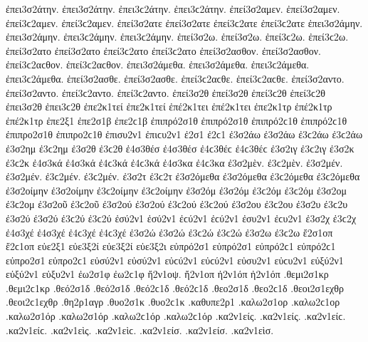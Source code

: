 {ἐπει3σ2άτην. ἐπει3σ2άτην. ἐπει3ϲ2άτην. ἐπει3ϲ2άτην. 
ἐπεί3σ2αμεν. ἐπεί3σ2αμεν. ἐπεί3ϲ2αμεν. ἐπεί3ϲ2αμεν. 
ἐπεί3σ2ατε ἐπεί3σ2ατε ἐπεί3ϲ2ατε ἐπεί3ϲ2ατε 
ἐπει3σ2άμην. ἐπει3σ2άμην. ἐπει3ϲ2άμην. ἐπει3ϲ2άμην. 
ἐπεί3σ2ω. ἐπεί3σ2ω. ἐπεί3ϲ2ω. ἐπεί3ϲ2ω. 
ἐπεί3σ2ατο ἐπεί3σ2ατο ἐπεί3ϲ2ατο ἐπεί3ϲ2ατο 
ἐπεί3σ2ασθον. ἐπεί3σ2ασθον. ἐπεί3ϲ2αϲθον. ἐπεί3ϲ2αϲθον. 
ἐπει3σ2άμεθα. ἐπει3σ2άμεθα. ἐπει3ϲ2άμεθα. ἐπει3ϲ2άμεθα. 
ἐπεί3σ2ασθε. ἐπεί3σ2ασθε. ἐπεί3ϲ2αϲθε. ἐπεί3ϲ2αϲθε. 
ἐπεί3σ2αντο. ἐπεί3σ2αντο. ἐπεί3ϲ2αντο. ἐπεί3ϲ2αντο. 
ἐπεί3σ2θ ἐπεί3σ2θ ἐπεί3ϲ2θ ἐπεί3ϲ2θ   %
ἐπει3σ2θ ἐπει3ϲ2θ 
ἐπε2κ1τεί ἐπε2κ1τεί   %
ἐπέ2κ1τει ἐπέ2κ1τει 
ἐπε2κ1τρ   %
ἐπέ2κ1τρ ἐπέ2κ1τρ 
ἐπε2ξ1 
ἐπε2σ1β ἐπε2ϲ1β   %
ἐπιπρό2σ1θ ἐπιπρό2σ1θ ἐπιπρό2ϲ1θ ἐπιπρό2ϲ1θ   %
ἐπιπρο2σ1θ ἐπιπρο2ϲ1θ 
ἐπισυ2ν1 ἐπιϲυ2ν1   %
ἐ2σ1 ἐ2ϲ1 
ἐ3σ2άω ἐ3σ2άω ἐ3ϲ2άω ἐ3ϲ2άω   %
ἐ3σ2ημ ἐ3ϲ2ημ   %
ἐ3σ2θ ἐ3ϲ2θ   %
ἐ4σ3θέσ ἐ4σ3θέσ ἐ4ϲ3θέϲ ἐ4ϲ3θέϲ   %
ἐ3σ2ιγ ἐ3ϲ2ιγ   %
ἐ3σ2κ ἐ3ϲ2κ 
ἐ4σ3κά ἐ4σ3κά ἐ4ϲ3κά ἐ4ϲ3κά   %
ἐ4σ3κα ἐ4ϲ3κα   %
%
ἐ3σ2μὲν. ἐ3ϲ2μὲν. ἐ3σ2μέν. ἐ3σ2μέν. ἐ3ϲ2μέν. ἐ3ϲ2μέν.   %
ἐ3σ2τ ἐ3ϲ2τ 
ἐ3σ2όμεθα ἐ3σ2όμεθα ἐ3ϲ2όμεθα ἐ3ϲ2όμεθα 
ἐ3σ2οίμην ἐ3σ2οίμην ἐ3ϲ2οίμην ἐ3ϲ2οίμην 
ἐ3σ2όμ ἐ3σ2όμ ἐ3ϲ2όμ ἐ3ϲ2όμ   %
ἐ3σ2ομ ἐ3ϲ2ομ 
ἐ3σ2οῦ ἐ3ϲ2οῦ   %
ἐ3σ2ού ἐ3σ2ού ἐ3ϲ2ού ἐ3ϲ2ού   %
ἐ3σ2ου ἐ3ϲ2ου   %
%
ἐ3σ2υ ἐ3ϲ2υ   %
ἐ3σ2ύ ἐ3σ2ύ ἐ3ϲ2ύ ἐ3ϲ2ύ 
ἐσύ2ν1 ἐσύ2ν1 ἐϲύ2ν1 ἐϲύ2ν1   %
ἐσυ2ν1 ἐϲυ2ν1 
ἐ3σ2χ ἐ3ϲ2χ 
ἐ4σ3χέ ἐ4σ3χέ ἐ4ϲ3χέ ἐ4ϲ3χέ   %
ἐ3σ2ώ ἐ3σ2ώ ἐ3ϲ2ώ ἐ3ϲ2ώ 
ἐ3σ2ω ἐ3ϲ2ω 
ἔ2σ1οπ ἔ2ϲ1οπ   %
εὐε2ξ1   %
εὐε3ξ2ί εὐε3ξ2ί   %
εὐε3ξ2ι 
εὐπρό2σ1 εὐπρό2σ1 εὐπρό2ϲ1 εὐπρό2ϲ1   %
εὐπρο2σ1 εὐπρο2ϲ1 
εὐσύ2ν1 εὐσύ2ν1 εὐϲύ2ν1 εὐϲύ2ν1   %
εὐσυ2ν1 εὐϲυ2ν1 
εὐξύ2ν1 εὐξύ2ν1   %
εὐξυ2ν1 
ἐω2σ1φ ἐω2ϲ1φ   %
ἤ2ν1οψ.   %
ἤ2ν1οπ 
ἠ2ν1όπ ἠ2ν1όπ 
.θεμι2σ1κρ .θεμι2ϲ1κρ   %
.θεό2σ1δ .θεό2σ1δ .θεό2ϲ1δ .θεό2ϲ1δ   %
.θεο2σ1δ .θεο2ϲ1δ 
.θεοι2σ1εχθρ .θεοι2ϲ1εχθρ   %
.θη2ρ1αγρ   %
.θυο2σ1κ .θυο2ϲ1κ   %
.καθυπε2ρ1   %
.καλω2σ1ορ .καλω2ϲ1ορ   %
.καλω2σ1όρ .καλω2σ1όρ .καλω2ϲ1όρ .καλω2ϲ1όρ 
.κα2ν1είς. .κα2ν1είς. .κα2ν1είϲ. .κα2ν1είϲ.   %
.κα2ν1εὶς. .κα2ν1εὶϲ. 
.κα2ν1είσ. .κα2ν1είσ. 
.κα2ν1εὶσ. 
}
